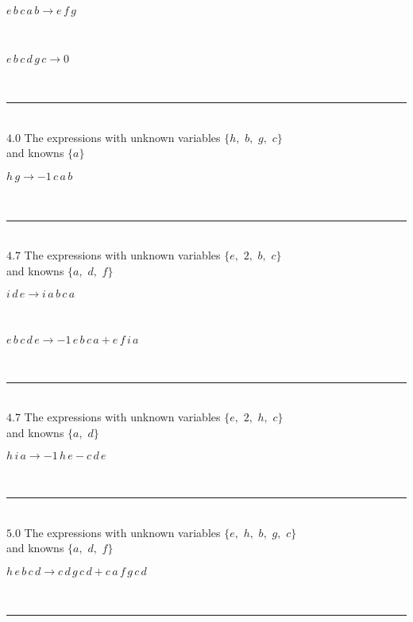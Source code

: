 \documentclass[rep10,leqno]{report}
\begin{document}
\begin{minipage}{6in}
$
e\,
 b\,
 c\,
 a\,
 b\rightarrow e\,
 f\,
 g
$
\end{minipage}\medskip \\
\begin{minipage}{6in}
$
e\,
 b\,
 c\,
 d\,
 g\,
 c\rightarrow 0
$
\end{minipage}\\
\rule[3pt]{6in}{.7pt}\\
$4.0$  The expressions with unknown variables $\{h,
$ $
b,
$ $
g,
$ $
c\}$\\
and knowns $\{a\}$\smallskip\\
\begin{minipage}{6in}
$
h\,
 g\rightarrow -1\,
 c\,
 a\,
 b
$
\end{minipage}\\
\rule[3pt]{6in}{.7pt}\\
$4.7$  The expressions with unknown variables $\{e,
$ $
2,
$ $
b,
$ $
c\}$\\
and knowns $\{a,
$ $
d,
$ $
f\}$\smallskip\\
\begin{minipage}{6in}
$
i\,
 d\,
 e\rightarrow i\,
 a\,
 b\,
 c\,
 a
$
\end{minipage}\medskip \\
\begin{minipage}{6in}
$
e\,
 b\,
 c\,
 d\,
 e\rightarrow -1\,
 e\,
 b\,
 c\,
 a + e\,
 f\,
 i\,
 a
$
\end{minipage}\\
\rule[3pt]{6in}{.7pt}\\
$4.7$  The expressions with unknown variables $\{e,
$ $
2,
$ $
h,
$ $
c\}$\\
and knowns $\{a,
$ $
d\}$\smallskip\\
\begin{minipage}{6in}
$
h\,
 i\,
 a\rightarrow -1\,
 h\,
 e - c\,
 d\,
 e
$
\end{minipage}\\
\rule[3pt]{6in}{.7pt}\\
$5.0$  The expressions with unknown variables $\{e,
$ $
h,
$ $
b,
$ $
g,
$ $
c\}$\\
and knowns $\{a,
$ $
d,
$ $
f\}$\smallskip\\
\begin{minipage}{6in}
$
h\,
 e\,
 b\,
 c\,
 d\rightarrow c\,
 d\,
 g\,
 c\,
 d + c\,
 a\,
 f\,
 g\,
 c\,
 d
$
\end{minipage}\\
\rule[3pt]{6in}{.7pt}\\
\end{document}
